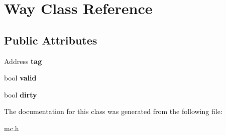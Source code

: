 \hypertarget{classWay}{\section{Way Class Reference}
\label{classWay}
}
\subsection*{Public Attributes}
\begin{DoxyCompactItemize}
\item 
\hypertarget{classWay_a68b6cf1dbbbcb15008e981dbccb6e8c5}{Address {\bfseries tag}}\label{classWay_a68b6cf1dbbbcb15008e981dbccb6e8c5}

\item 
\hypertarget{classWay_a939c77ff92953043bc1ddb1004b58347}{bool {\bfseries valid}}\label{classWay_a939c77ff92953043bc1ddb1004b58347}

\item 
\hypertarget{classWay_af8467afba128edc56b0f9651a644740e}{bool {\bfseries dirty}}\label{classWay_af8467afba128edc56b0f9651a644740e}

\end{DoxyCompactItemize}


The documentation for this class was generated from the following file\-:\begin{DoxyCompactItemize}
\item 
mc.\-h\end{DoxyCompactItemize}
